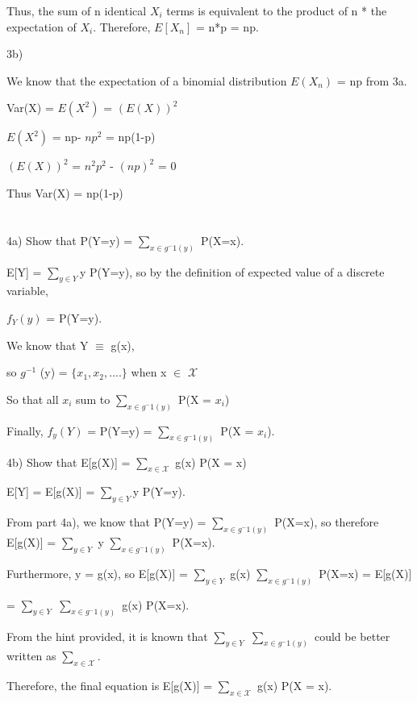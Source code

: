 Thus, the sum of n identical $X_i$ terms is equivalent to the product of n * the expectation of $X_i$. Therefore, $E[X_n]$ = n*p = np.

3b)

We know that the expectation of a binomial distribution $E(X_n)$ = np from 3a.

Var(X) = $E(X^2)$ = $(E(X))^2$

$E(X^2)$ = np- $np^2$ = np(1-p)

$(E(X))^2$ = $n^2p^2$ - $(np)^2$ = 0

Thus Var(X) = np(1-p)


\newpage
\section{}

4a) Show that P(Y=y) = $\sum_{x\in g^-1(y)}$ P(X=x).

E[Y] = $\sum_{y\in Y}$y P(Y=y), so by the definition of expected value of a discrete variable, 

$f_Y(y)$ = P(Y=y).

We know that Y $\equiv$ g(x), 

so $g^{-1}$ (y) = $\{x_1,x_2,....\}$ when x $\in$ $\mathcal{X}$

So that all $x_i$ sum to $\sum_{x\in g^-1(y)}$ P(X = $x_i$)

Finally, $f_y(Y)$ = P(Y=y) = $\sum_{x\in g^-1(y)}$ P(X = $x_i$).


4b) Show that E[g(X)] = $\sum_{x\in \mathcal{X}}$ g(x) P(X = x)

E[Y] = E[g(X)] = $\sum_{y\in Y}$y P(Y=y).

From part 4a), we know that P(Y=y) = $\sum_{x\in g^-1(y)}$ P(X=x), so therefore E[g(X)] = $\sum_{y\in Y}$ y $\sum_{x\in g^-1(y)}$ P(X=x). 

Furthermore, y = g(x), so  E[g(X)] = $\sum_{y\in Y}$ g(x) $\sum_{x\in g^-1(y)}$ P(X=x) = E[g(X)] 

= $\sum_{y\in Y}$ $\sum_{x\in g^-1(y)}$  g(x) P(X=x).

From the hint provided, it is known that $\sum_{y\in Y}$ $\sum_{x\in g^-1(y)}$ could be better written as $\sum_{x\in \mathcal{X}}$.

Therefore, the final equation is E[g(X)] = $\sum_{x\in \mathcal{X}}$ g(x) P(X = x).

\newpage
\section{}

